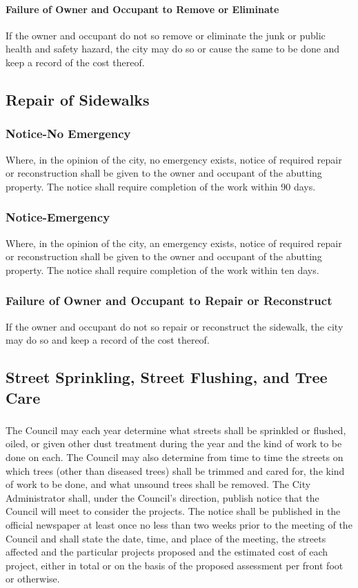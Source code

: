 \documentclass[code.tex]{subfiles}
\begin{document}
\paragraph{Failure of Owner and Occupant to Remove or Eliminate}
If the owner and occupant do not so remove or eliminate the junk or public health and safety hazard, the city may do so or cause the same to be done and keep a record of the cost thereof.
\subsection{Repair of Sidewalks}
\subsubsection{Notice-No Emergency}
Where, in the opinion of the city, no emergency exists, notice of required repair or reconstruction shall be given to the owner and occupant of the abutting property.  The notice shall require completion of the work within 90 days.
\subsubsection{Notice-Emergency}
Where, in the opinion of the city, an emergency exists, notice of required repair or reconstruction shall be given to the owner and occupant of the abutting property.  The notice shall require completion of the work within ten days.
\subsubsection{Failure of Owner and Occupant to Repair or Reconstruct}
If the owner and occupant do not so repair or reconstruct the sidewalk, the city may do so and keep a record of the cost thereof.
\subsection{Street Sprinkling, Street Flushing, and Tree Care}
\subsubsection{}
The Council may each year determine what streets shall be sprinkled or flushed, oiled, or given other dust treatment during the year and the kind of work to be done on each.  The Council may also determine from time to time the streets on which trees (other than diseased trees) shall be trimmed and cared for, the kind of work to be done, and what unsound trees shall be removed.  The City Administrator shall, under the Council’s direction, publish notice that the Council will meet to consider the projects.  The notice shall be published in the official newspaper at least once no less than two weeks prior to the meeting of the Council and shall state the date, time, and place of the meeting, the streets affected and the particular projects proposed and the estimated cost of each project, either in total or on the basis of the proposed assessment per front foot or otherwise.
\end{document}
